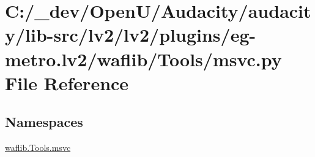 \hypertarget{lv2_2plugins_2eg-metro_8lv2_2waflib_2_tools_2msvc_8py}{}\section{C\+:/\+\_\+dev/\+Open\+U/\+Audacity/audacity/lib-\/src/lv2/lv2/plugins/eg-\/metro.lv2/waflib/\+Tools/msvc.py File Reference}
\label{lv2_2plugins_2eg-metro_8lv2_2waflib_2_tools_2msvc_8py}
\subsection*{Namespaces}
\begin{DoxyCompactItemize}
\item 
 \hyperlink{namespacewaflib_1_1_tools_1_1msvc}{waflib.\+Tools.\+msvc}
\end{DoxyCompactItemize}
